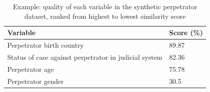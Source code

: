 \vspace{10pt}

\begin{table}[H]
\centering
\small
\begin{tabular}{@{}ll@{}}
\toprule
Variable                                              & Score (\%)   \\ \midrule
Perpetrator birth country                             & 89.87 \\
Status of case against perpetrator in judicial system & 82.36 \\
Perpetrator age                                       & 75.78 \\
Perpetrator gender                                    & 30.5 \\ \bottomrule
\end{tabular}
\caption{Example: quality of each variable in the synthetic perpetrator dataset, ranked from highest to lowest similarity score}
\label{tab:my-table}
\end{table}
\vspace{10pt}


